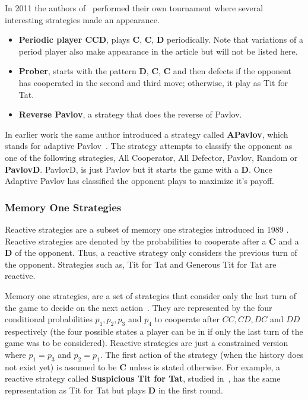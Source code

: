 \documentclass{article}
\begin{document}
In 2011 the authors of~\cite{Li2011} performed their own tournament where several interesting
strategies made an appearance. 

\begin{itemize}
    \item \textbf{Periodic player CCD}, plays \textbf{C}, \textbf{C}, \textbf{D} 
    periodically. Note that variations of a period player also make appearance
    in the article but will not be listed here.
    \item \textbf{Prober}, starts with the pattern \textbf{D}, \textbf{C}, \textbf{C}
     and then defects if the opponent has cooperated in the second and third move;
     otherwise, it play as Tit for Tat.
    \item \textbf{Reverse Pavlov}, a strategy that does the reverse of Pavlov.
\end{itemize}

In earlier work the same author introduced a strategy called \textbf{APavlov},
which stands for adaptive Pavlov~\cite{Li2007}. The strategy attempts to 
classify the opponent as one of the following strategies, All Cooperator, 
All Defector, Pavlov, Random or \textbf{PavlovD}. PavlovD, is just Pavlov
but it starts the game with a \textbf{D}. Once Adaptive Pavlov has classified
the opponent plays to maximize it's payoff.

\subsubsection{Memory One Strategies}

Reactive strategies are a subset of memory one strategies introduced in 1989
\cite{nowak1989}. Reactive strategies are denoted by the probabilities to cooperate
after a \textbf{C} and a \textbf{D} of the opponent. Thus, a reactive strategy
only considers the previous turn of the opponent. Strategies such as, Tit for
Tat and Generous Tit for Tat are reactive.

Memory one strategies, are a set of strategies that consider only the last turn
of the game to decide on the next action~\cite{Nowak1990}. They are represented
by the four conditional probabilities \(p_1, p_2, p_3\) and
\(p_4\) to cooperate after \(CC, CD, DC\) and \(DD\) respectively
(the four possible states a player can be in if only the last turn of the game was
to be considered). Reactive strategies are just a constrained version where
\(p_1=p_3\) and \(p_2=p_1\). The first action of the strategy (when the history
does not exist yet) is assumed to be \textbf{C} unless is stated otherwise. For
example, a reactive strategy called \textbf{Suspicious Tit for Tat}, studied
in~\cite{Nowak1992}, has the same representation as Tit for Tat but plays
\textbf{D} in the first round.
\end{document}
